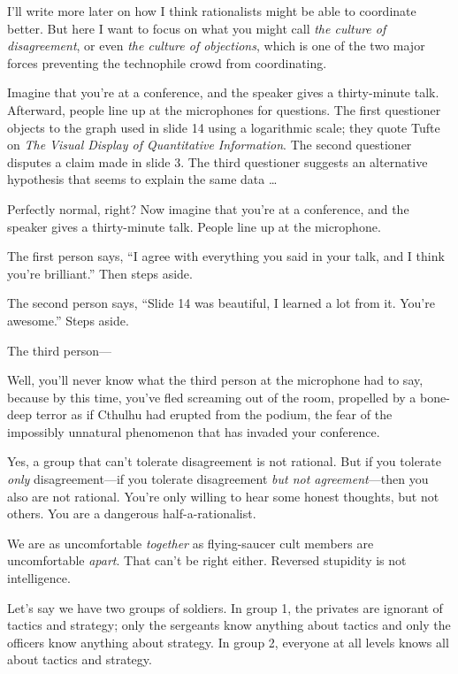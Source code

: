 {
 I'll write more later on how I think rationalists
might be able to coordinate better. But here I want to focus on what
you might call \textit{the culture of disagreement}, or even
\textit{the culture of objections}, which is one of the two major
forces preventing the technophile crowd from coordinating.}

{
 Imagine that you're at a conference, and the
speaker gives a thirty-minute talk. Afterward, people line up at the
microphones for questions. The first questioner objects to the graph
used in slide 14 using a logarithmic scale; they quote Tufte on
\textit{The Visual Display of Quantitative Information}. The second
questioner disputes a claim made in slide 3. The third questioner
suggests an alternative hypothesis that seems to explain the same data
\ldots}

{
 Perfectly normal, right? Now imagine that you're
at a conference, and the speaker gives a thirty-minute talk. People
line up at the microphone.}

{
 The first person says, ``I agree with everything
you said in your talk, and I think you're
brilliant.'' Then steps aside.}

{
 The second person says, ``Slide 14 was beautiful,
I learned a lot from it. You're
awesome.'' Steps aside.}

{
 The third person---}

{
 Well, you'll never know what the third person at
the microphone had to say, because by this time, you've
fled screaming out of the room, propelled by a bone-deep terror as if
Cthulhu had erupted from the podium, the fear of the impossibly
unnatural phenomenon that has invaded your conference.}

{
 Yes, a group that can't tolerate disagreement is
not rational. But if you tolerate \textit{only} disagreement---if you
tolerate disagreement \textit{but not agreement}{}---then you also are
not rational. You're only willing to hear some honest
thoughts, but not others. You are a dangerous half-a-rationalist.}

{
 We are as uncomfortable \textit{together} as flying-saucer cult
members are uncomfortable \textit{apart}. That can't be
right either. Reversed stupidity is not intelligence.}

{
 Let's say we have two groups of soldiers. In group
1, the privates are ignorant of tactics and strategy; only the
sergeants know anything about tactics and only the officers know
anything about strategy. In group 2, everyone at all levels knows all
about tactics and strategy.}

